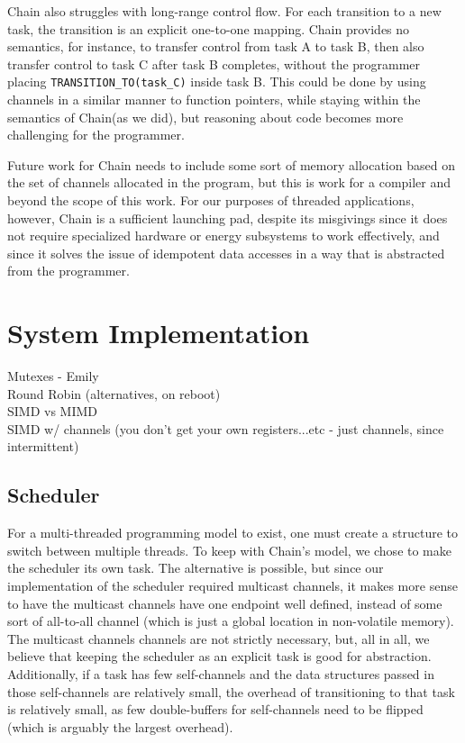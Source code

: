 \documentclass[11pt]{sensys-proc}
\newcommand{\chain}{Chain\xspace}
\begin{document}
\chain also struggles with long-range control flow. For each transition to a
new task, the transition is an explicit one-to-one mapping. \chain provides no
semantics, for instance, to transfer control from task A to task B, then also
transfer control to task C after task B completes, without the programmer
placing \texttt{TRANSITION\_TO(task\_C)} inside task B. This could be done by
using channels in a similar manner to function pointers, while staying within
the semantics of \chain (as we did), but reasoning about code becomes more
challenging for the programmer.


Future work for \chain needs to include some sort of memory allocation based on
the set of channels allocated in the program, but this is work for a compiler
and beyond the scope of this work. For our purposes of threaded applications,
however, \chain is a sufficient launching pad, despite its misgivings since it
does not require specialized hardware or energy subsystems to work effectively,
and since it solves the issue of idempotent data accesses in a way that is
abstracted from the programmer.


\section{System Implementation } %
Mutexes - Emily\\
Round Robin (alternatives, on reboot)\\
SIMD vs MIMD\\
SIMD w/ channels (you don't get your own registers...etc -
    just channels, since intermittent)\\


\subsection{Scheduler}
For a multi-threaded programming model to exist, one must create a structure to
switch between multiple threads. To keep with \chain's model, we chose to make
the scheduler its own task. The alternative is possible, but since our
implementation of the scheduler required multicast channels, it makes more
sense to have the multicast channels have one endpoint well defined, instead of
some sort of all-to-all channel (which is just a global location in
non-volatile memory). The multicast channels channels are not strictly
necessary, but, all in all, we believe that keeping the scheduler as an
explicit task is good for abstraction. Additionally, if a task has few
self-channels and the data structures passed in those self-channels are
relatively small, the overhead of transitioning to that task is relatively
small, as few double-buffers for self-channels need to be flipped (which is
arguably the largest overhead).
\end{document}
